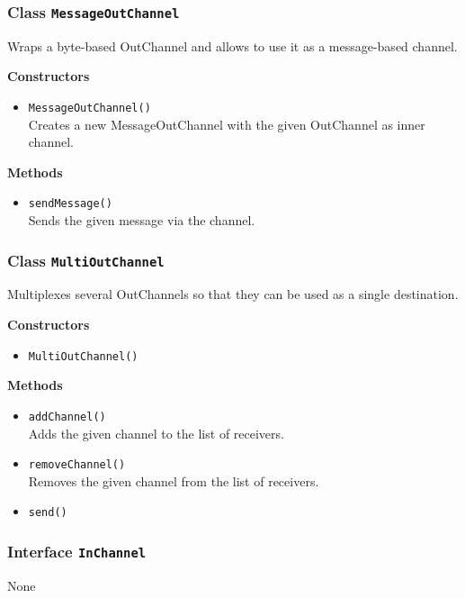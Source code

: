 \subsubsection{Class \lstinline|MessageOutChannel|}
Wraps a byte-based OutChannel and allows to use it as a message-based
 channel.

\textbf{Constructors}
\begin{itemize}
\item \lstinline|MessageOutChannel()| \\
Creates a new MessageOutChannel with the given OutChannel as inner channel.

\end{itemize}

\textbf{Methods}
\begin{itemize}
\item \lstinline|sendMessage()| \\
Sends the given message via the channel.

\end{itemize}

\subsubsection{Class \lstinline|MultiOutChannel|}
Multiplexes several OutChannels so that they can be used as a single
 destination.

\textbf{Constructors}
\begin{itemize}
\item \lstinline|MultiOutChannel()| \\


\end{itemize}

\textbf{Methods}
\begin{itemize}
\item \lstinline|addChannel()| \\
Adds the given channel to the list of receivers.

\item \lstinline|removeChannel()| \\
Removes the given channel from the list of receivers.

\item \lstinline|send()| \\


\end{itemize}

\subsubsection{Interface \lstinline|InChannel|}
None


